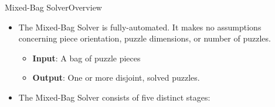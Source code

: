 \documentclass[10pt]{beamer}
\begin{document}
\begin{frame}{Mixed-Bag Solver}{Overview}
  \begin{itemize}
    \item The Mixed-Bag Solver is fully-automated.  It makes no assumptions concerning piece orientation, puzzle dimensions, or number of puzzles.
    \vspace{0.4em}
    \begin{itemize}
      \setlength\itemsep{0.8em}
      \item \textbf{Input}: A bag of puzzle pieces
      \item \textbf{Output}: One or more disjoint, solved puzzles.
    \end{itemize}
    \vfill    
    \item The Mixed-Bag Solver consists of five distinct stages:
	  \vspace{-0.4em}
  \end{itemize}
  \begin{center}
    \vfill    
  \end{center}
\end{frame}
\end{document}

